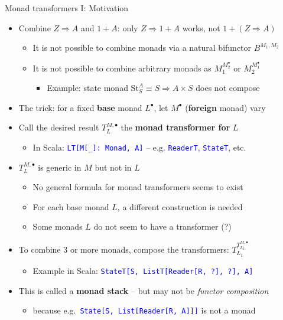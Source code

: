 \documentclass[english]{beamer}
\begin{document}
\begin{frame}{Monad transformers I: Motivation}

\begin{itemize}
\item {\footnotesize{}\vspace{-0.2cm}}Combine $Z\Rightarrow A$ and $1+A$:
only $Z\Rightarrow1+A$ works, not $1+\left(Z\Rightarrow A\right)$
\begin{itemize}
\item It is not possible to combine monads via a natural bifunctor $B^{M_{1},M_{2}}$
\item It is not possible to combine arbitrary monads as $M_{1}^{M_{2}^{\bullet}}$
or $M_{2}^{M_{1}^{\bullet}}$
\begin{itemize}
\item Example: state monad $\text{St}_{S}^{A}\equiv S\Rightarrow A\times S$
does not compose
\end{itemize}
\end{itemize}
\item The trick: for a fixed \textbf{base }monad $L^{\bullet}$, let $M^{\bullet}$
(\textbf{foreign }monad) vary
\item Call the desired result $T_{L}^{M,\bullet}$ the \textbf{monad transformer
for} $L$
\begin{itemize}
\item In Scala: \texttt{\textcolor{blue}{\footnotesize{}LT{[}M{[}\_{]}:~Monad,
A{]}}} -- e.g. \texttt{\textcolor{blue}{\footnotesize{}ReaderT}},
\texttt{\textcolor{blue}{\footnotesize{}StateT}}, etc.
\end{itemize}
\item $T_{L}^{M,\bullet}$ is generic in $M$ but not in $L$
\begin{itemize}
\item No general formula for monad transformers seems to exist
\item For each base monad $L$, a different construction is needed
\item Some monads $L$ do not seem to have a transformer (?)
\end{itemize}
\item To combine 3 or more monads, compose the transformers: $T_{L_{1}}^{T_{L_{2}}^{M,\bullet}}$
\begin{itemize}
\item Example in Scala: \texttt{\textcolor{blue}{\footnotesize{}StateT{[}S,
ListT{[}Reader{[}R, ?{]}, ?{]}, A{]}}} 
\end{itemize}
\item This is called a \textbf{monad stack} -- but may not be \emph{functor
composition}
\begin{itemize}
\item because e.g.~\texttt{\textcolor{blue}{\footnotesize{}State{[}S, List{[}Reader{[}R,
A{]}{]}{]}}} is not a monad
\end{itemize}
\end{itemize}
\end{frame}
\end{document}
